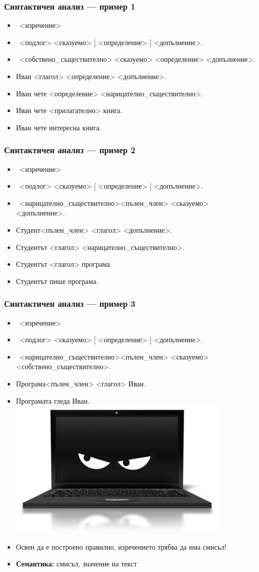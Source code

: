\documentclass{beamer}
\begin{document}
\begin{frame}
  \frametitle{Синтактичен анализ — пример 1}
  \begin{itemize}[<+->]
  \item\ <изречение>
  \item\ <подлог> <сказуемо> [ <определение> ] <допълнение>\alert.
  \item\ <собствено\_съществително> <сказуемо> <определение> <допълнение>\alert.
  \item \alert{Иван} <глагол> <определение> <допълнение>\alert.
  \item \alert{Иван чете} <определение> <нарицателно\_съществително>\alert.
  \item \alert{Иван чете} <прилагателно> \alert{книга.}
  \item \alert{Иван чете интересна книга.}
  \end{itemize}
\end{frame}

\begin{frame}
  \frametitle{Синтактичен анализ — пример 2}
  \begin{itemize}[<+->]
  \item\ <изречение>
  \item\ <подлог> <сказуемо> [ <определение> ] <допълнение>\alert.
  \item\ <нарицателно\_съществително><пълен\_член> <сказуемо> <допълнение>\alert.
  \item \alert{Студент}{}<пълен\_член> <глагол> <допълнение>\alert.
  \item \alert{Студентът} <глагол> <нарицателно\_съществително>\alert.
  \item \alert{Студентът} <глагол> \alert{програма.}
  \item \alert{Студентът пише програма.}
  \end{itemize}
\end{frame}

\begin{frame}
  \frametitle{Синтактичен анализ — пример 3}
  \begin{itemize}[<+->]
  \item\ <изречение>
  \item\ <подлог> <сказуемо> [ <определение> ] <допълнение>\alert.
  \item\ <нарицателно\_съществително><пълен\_член> <сказуемо> <собствено\_съществително>\alert.
  \item \alert{Програма}{}<пълен\_член> <глагол> \alert{Иван.}
  \item \alert{Програмата гледа Иван.} \onslide<+-> \includegraphics[width=20ex, right]{images/creepy.png}
  \item Освен да е построено правилно, изречението трябва да има смисъл!
  \item \textbf{Семантика:} смисъл, значение на текст
  \end{itemize}
\end{frame}
\end{document}
